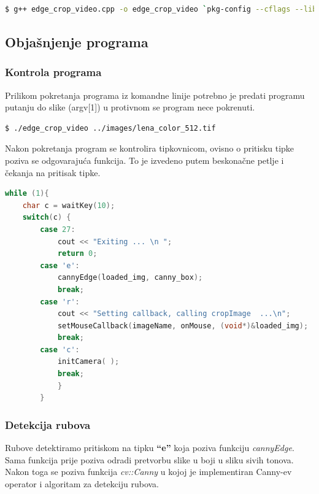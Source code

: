 \begin{lstlisting}[language=bash,caption={Pokretanje prevodioca iz
    komandne linije}]
$ g++ edge_crop_video.cpp -o edge_crop_video `pkg-config --cflags --libs opencv`
\end{lstlisting}

\newpage
\subsection{Objašnjenje programa}

\subsubsection{Kontrola programa}

Prilikom pokretanja programa iz komandne linije potrebno je 
predati programu putanju do slike (argv[1]) u protivnom se program 
nece pokrenuti. \\

\begin{lstlisting}[language=bash,caption={Pokretanje programa iz
    komandne linije}]
$ ./edge_crop_video ../images/lena_color_512.tif
\end{lstlisting}

Nakon pokretanja program se kontrolira tipkovnicom, ovisno o
pritisku tipke poziva se odgovarajuća funkcija. To je izvedeno 
putem beskonačne petlje i čekanja na pritisak tipke. 
\\

\begin{lstlisting}[language=C,caption={Kontrola programa tipkovnicom}]
while (1){
    char c = waitKey(10);
    switch(c) {
        case 27:
            cout << "Exiting ... \n ";
            return 0;
        case 'e':
            cannyEdge(loaded_img, canny_box);
            break;
        case 'r':
            cout << "Setting callback, calling cropImage  ...\n";
            setMouseCallback(imageName, onMouse, (void*)&loaded_img);
            break;
        case 'c':
            initCamera( );
            break; 
            }
        }
\end{lstlisting}

\newpage
\subsubsection{Detekcija rubova}

Rubove detektiramo pritiskom na tipku \textbf{``e''}  koja poziva funkciju
\textit{cannyEdge}. Sama funkcija prije poziva odradi pretvorbu slike u boji
u sliku sivih tonova. Nakon toga se poziva funkcija \textit{cv::Canny} 
u kojoj je implementiran Canny-ev operator i algoritam za detekciju
rubova.
\\

